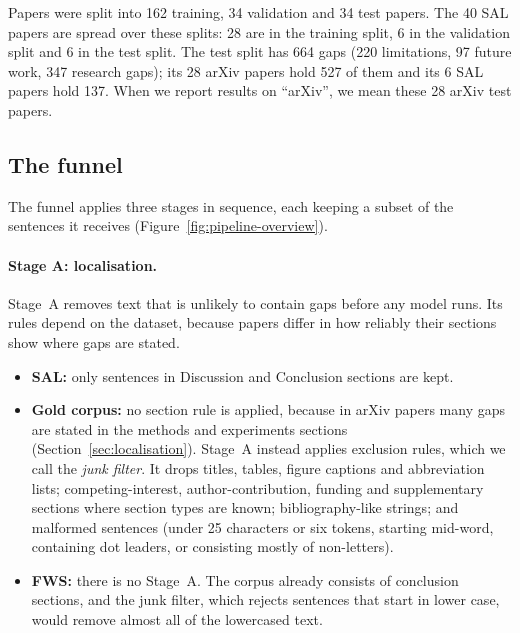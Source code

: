 Papers were split into 162 training, 34 validation and 34 test papers. The 40 SAL papers are spread over these splits: 28 are in the training split, 6 in the validation split and 6 in the test split. The test split has 664 gaps (220 limitations, 97 future work, 347 research gaps); its 28 arXiv papers hold 527 of them and its 6 SAL papers hold 137. When we report results on ``arXiv'', we mean these 28 arXiv test papers.

\subsection{The funnel}
\label{sec:funnel}

The funnel applies three stages in sequence, each keeping a subset of the sentences it receives (Figure~\ref{fig:pipeline-overview}).

\paragraph{Stage A: localisation.} Stage~A removes text that is unlikely to contain gaps before any model runs. Its rules depend on the dataset, because papers differ in how reliably their sections show where gaps are stated.
\begin{itemize}
  \item \textbf{SAL:} only sentences in Discussion and Conclusion sections are kept.
  \item \textbf{Gold corpus:} no section rule is applied, because in arXiv papers many gaps are stated in the methods and experiments sections (Section~\ref{sec:localisation}). Stage~A instead applies exclusion rules, which we call the \emph{junk filter}. It drops titles, tables, figure captions and abbreviation lists; competing-interest, author-contribution, funding and supplementary sections where section types are known; bibliography-like strings; and malformed sentences (under 25 characters or six tokens, starting mid-word, containing dot leaders, or consisting mostly of non-letters).
  \item \textbf{FWS:} there is no Stage~A. The corpus already consists of conclusion sections, and the junk filter, which rejects sentences that start in lower case, would remove almost all of the lowercased text.
\end{itemize}

